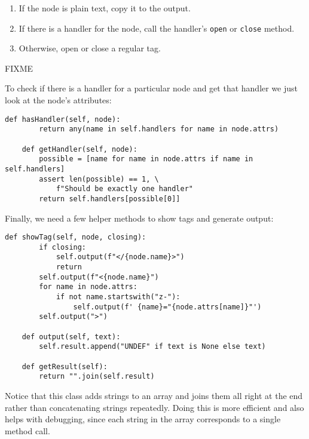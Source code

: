 \documentclass{scrbook}
\begin{document}
\begin{enumerate}

\item 

If the node is plain text, copy it to the output.



\item 

If there is a handler for the node,
    call the handler's \texttt{open} or \texttt{close} method.



\item 

Otherwise, open or close a regular tag.



\end{enumerate}


FIXME


To check if there is a handler for a particular node and get that handler
we just look at the node's attributes:


\begin{lstlisting}[frame=single,frameround=tttt]
    def hasHandler(self, node):
        return any(name in self.handlers for name in node.attrs)

    def getHandler(self, node):
        possible = [name for name in node.attrs if name in self.handlers]
        assert len(possible) == 1, \
            f"Should be exactly one handler"
        return self.handlers[possible[0]]
\end{lstlisting}



Finally, we need a few helper methods to show tags and generate output:


\begin{lstlisting}[frame=single,frameround=tttt]
    def showTag(self, node, closing):
        if closing:
            self.output(f"</{node.name}>")
            return
        self.output(f"<{node.name}")
        for name in node.attrs:
            if not name.startswith("z-"):
                self.output(f' {name}="{node.attrs[name]}"')
        self.output(">")

    def output(self, text):
        self.result.append("UNDEF" if text is None else text)

    def getResult(self):
        return "".join(self.result)
\end{lstlisting}



\noindent Notice that this class adds strings to an array and joins them all right at the end
rather than concatenating strings repeatedly.
Doing this is more efficient and also helps with debugging,
since each string in the array corresponds to a single method call.
\end{document}
